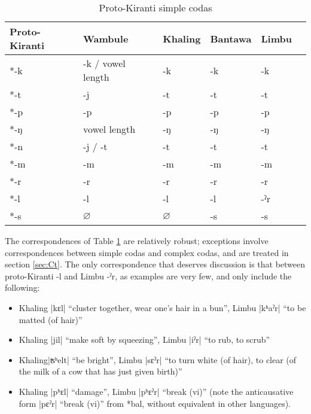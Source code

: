 \documentclass[oldfontcommands,oneside,a4paper,11pt]{article}
\newcommand{\ipa}[1]{{\phon\mbox{#1}}} %
\newcommand{\dhatu}[2]{|\ipa{#1}| ``#2''}
\begin{document}
\begin{table}[H]
\caption{Proto-Kiranti simple codas} \centering \label{tab:codas}
\begin{tabular}{llllll}
\toprule
Proto-Kiranti & Wambule & Khaling & Bantawa & Limbu \\
\midrule
\ipa{*-k} & \ipa{-k} / vowel length& \ipa{-k} & \ipa{-k} & \ipa{-k}  \\
\ipa{*-t} & \ipa{-j} & \ipa{-t} & \ipa{-t} & \ipa{-t}  \\
\ipa{*-p} & \ipa{-p} & \ipa{-p} & \ipa{-p} & \ipa{-p}  \\
\midrule
\ipa{*-ŋ} & vowel length & \ipa{-ŋ} & \ipa{-ŋ} & \ipa{-ŋ}  \\
\ipa{*-n} & \ipa{-j} /  \ipa{-t} & \ipa{-t} & \ipa{-t} & \ipa{-t}  \\
\ipa{*-m} & \ipa{-m} & \ipa{-m} & \ipa{-m} & \ipa{-m}  \\
\midrule
\ipa{*-r} &  \ipa{-r}  & \ipa{-r} & \ipa{-r} & \ipa{-r}  \\
\ipa{*-l} & \ipa{-l} & \ipa{-l} & \ipa{-l} & \ipa{-ˀr}  \\
\ipa{*-s} &$\varnothing$ & $\varnothing$ & \ipa{-s} & \ipa{-s}  \\
\bottomrule
\end{tabular}
\end{table}

The correspondences of Table \ref{tab:codas} are relatively robust; exceptions involve correspondences between simple codas and complex codas, and are treated in section \ref{sec:Ct}. The only correspondence that deserves discussion is that between proto-Kiranti \ipa{-l} and Limbu \ipa{-ˀr}, as examples are very few, and only include the following:

\begin{itemize}
\item  Khaling \dhatu{kɛl}{cluster together, wear one's hair in a bun}, Limbu \dhatu{kʰaˀr}{to be matted (of hair)}  			 
\item  Khaling \dhatu{jil}{make soft by squeezing}, Limbu \dhatu{iˀr}{to rub, to scrub}  		 
\item   Khaling\dhatu{ʦʰelt}{be bright}, Limbu \dhatu{sɛˀr}{to turn white (of hair), to clear (of the milk of a cow that has just given birth)}  
\item  Khaling \dhatu{pʰɛl}{damage}, Limbu \dhatu{pʰɛˀr}{break (vi)}  (note the anticausative form \dhatu{pɛˀr}{break (vi)}  from *\ipa{bal}, without equivalent in other languages).
\end{itemize}
\end{document}
